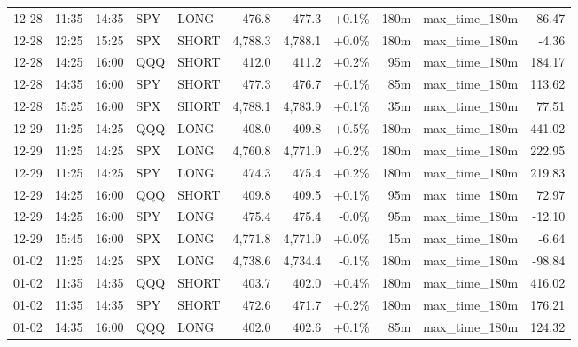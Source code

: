 \documentclass[11pt,a4paper,twoside]{article}
\begin{document}
\begin{center}
\begin{longtable}{>{\color{txtmain}}l l l l l r r r r >{\color{txtmain}}l r}
12-28 & 11:35 & 14:35 & SPY & LONG & 476.8 & 477.3 & \textcolor{wingreen}{+0.1\%} & 180m & max\_time\_180m & \textcolor{wingreen}{86.47} \\
12-28 & 12:25 & 15:25 & SPX & SHORT & 4,788.3 & 4,788.1 & \textcolor{wingreen}{+0.0\%} & 180m & max\_time\_180m & \textcolor{lossred}{-4.36} \\
12-28 & 14:25 & 16:00 & QQQ & SHORT & 412.0 & 411.2 & \textcolor{wingreen}{+0.2\%} & 95m & max\_time\_180m & \textcolor{wingreen}{184.17} \\
12-28 & 14:35 & 16:00 & SPY & SHORT & 477.3 & 476.7 & \textcolor{wingreen}{+0.1\%} & 85m & max\_time\_180m & \textcolor{wingreen}{113.62} \\
12-28 & 15:25 & 16:00 & SPX & SHORT & 4,788.1 & 4,783.9 & \textcolor{wingreen}{+0.1\%} & 35m & max\_time\_180m & \textcolor{wingreen}{77.51} \\
12-29 & 11:25 & 14:25 & QQQ & LONG & 408.0 & 409.8 & \textcolor{wingreen}{+0.5\%} & 180m & max\_time\_180m & \textcolor{wingreen}{441.02} \\
12-29 & 11:25 & 14:25 & SPX & LONG & 4,760.8 & 4,771.9 & \textcolor{wingreen}{+0.2\%} & 180m & max\_time\_180m & \textcolor{wingreen}{222.95} \\
12-29 & 11:25 & 14:25 & SPY & LONG & 474.3 & 475.4 & \textcolor{wingreen}{+0.2\%} & 180m & max\_time\_180m & \textcolor{wingreen}{219.83} \\
12-29 & 14:25 & 16:00 & QQQ & SHORT & 409.8 & 409.5 & \textcolor{wingreen}{+0.1\%} & 95m & max\_time\_180m & \textcolor{wingreen}{72.97} \\
12-29 & 14:25 & 16:00 & SPY & LONG & 475.4 & 475.4 & \textcolor{lossred}{-0.0\%} & 95m & max\_time\_180m & \textcolor{lossred}{-12.10} \\
12-29 & 15:45 & 16:00 & SPX & LONG & 4,771.8 & 4,771.9 & \textcolor{wingreen}{+0.0\%} & 15m & max\_time\_180m & \textcolor{lossred}{-6.64} \\
01-02 & 11:25 & 14:25 & SPX & LONG & 4,738.6 & 4,734.4 & \textcolor{lossred}{-0.1\%} & 180m & max\_time\_180m & \textcolor{lossred}{-98.84} \\
01-02 & 11:35 & 14:35 & QQQ & SHORT & 403.7 & 402.0 & \textcolor{wingreen}{+0.4\%} & 180m & max\_time\_180m & \textcolor{wingreen}{416.02} \\
01-02 & 11:35 & 14:35 & SPY & SHORT & 472.6 & 471.7 & \textcolor{wingreen}{+0.2\%} & 180m & max\_time\_180m & \textcolor{wingreen}{176.21} \\
01-02 & 14:35 & 16:00 & QQQ & LONG & 402.0 & 402.6 & \textcolor{wingreen}{+0.1\%} & 85m & max\_time\_180m & \textcolor{wingreen}{124.32} \\

\end{longtable}
\end{center}
\end{document}
